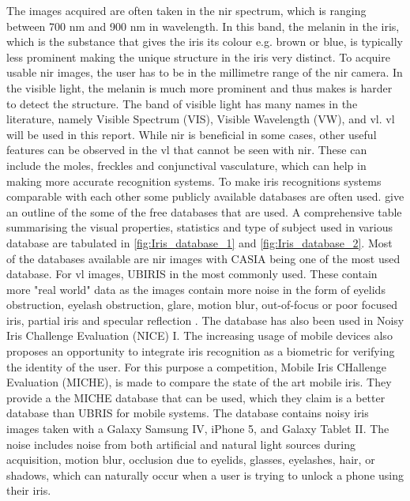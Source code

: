 The images acquired are often taken in the \gls{nir} spectrum, which is ranging between 700 nm and 900 nm in wavelength. In this band, the melanin in the iris, which is the substance that gives the iris its colour e.g. brown or blue, is typically less prominent making the unique structure in the iris very distinct. To acquire usable \gls{nir} images, the user has to be in the millimetre range of the \gls{nir} camera. In the visible light, the melanin is much more prominent and thus makes is harder to detect the structure. The band of visible light has many names in the literature, namely Visible Spectrum (VIS), Visible Wavelength (VW), and \gls{vl}. \gls{vl} will be used in this report. While \gls{nir} is beneficial in some cases, other useful features can be observed in the \gls{vl} that cannot be seen with \gls{nir}. These can include the moles, freckles and conjunctival vasculature, which can help in making more accurate recognition systems. To make iris recognitions systems comparable with each other some publicly available databases are often used. \cite{Rifaee2017}  give an outline of the some of the free databases that are used. A comprehensive table summarising the visual properties, statistics and type of subject used in various database are tabulated in \autoref{fig:Iris_database_1} and \autoref{fig:Iris_database_2}. Most of the databases available are \gls{nir} images with CASIA being one of the most used database. For \gls{vl} images, UBIRIS in the most commonly used. These contain more "real world" data as the images contain more noise in the form of eyelids obstruction, eyelash obstruction, glare, motion blur, out-of-focus or poor focused iris, partial iris and specular reflection \citep{Rattani2017}. The database has also been used in Noisy Iris Challenge Evaluation (NICE) I. The increasing usage of mobile devices also proposes an opportunity to integrate iris recognition as a biometric for verifying the identity of the user. For this purpose a competition, Mobile Iris CHallenge Evaluation (MICHE), is made to compare the state of the art mobile iris. They provide a the MICHE database that can be used, which they claim is a better database than UBRIS for mobile systems. The database contains noisy iris images taken with a Galaxy Samsung IV, iPhone 5, and Galaxy Tablet II. The noise includes noise from both artificial and natural light sources during acquisition, motion blur, occlusion due to eyelids, glasses, eyelashes, hair, or shadows, which can naturally occur when a user is trying to unlock a phone using their iris. 


